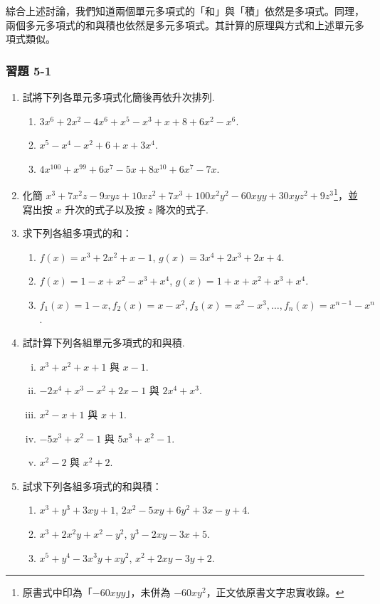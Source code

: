 綜合上述討論，我們知道兩個單元多項式的「和」與「積」依然是多項式。同理，兩個多元多項式的和與積也依然是多元多項式。其計算的原理與方式和上述單元多項式類似。

\subsubsection*{習題 5-1}\label{sec:ex5-1}

\begin{enumerate}[1.]
  \item 試將下列各單元多項式化簡後再依升次排列.
  \begin{enumerate}[(1)]
    \item $3x^6 + 2x^2 - 4x^6 + x^5 - x^3 + x + 8 + 6x^2 - x^6$.
    \item $x^5 - x^4 - x^2 + 6 + x + 3x^4$.
    \item $4x^{100} + x^{99} + 6x^7 - 5x + 8x^{10} + 6x^7 - 7x$.
  \end{enumerate}

  \item 化簡 $x^3 + 7x^2 z - 9xyz + 10xz^2 + 7x^3 + 100x^2 y^2 - 60xyy + 30xyz^2 + 9z^3$\footnote{原書式中印為「$-60xyy$」，未併為 $-60xy^2$，正文依原書文字忠實收錄。}，並寫出按 $x$ 升次的式子以及按 $z$ 降次的式子.

  \item 求下列各組多項式的和：
  \begin{enumerate}[(1)]
    \item $f(x)=x^3+2x^2+x-1$, $g(x)=3x^4+2x^3+2x+4$.
    \item $f(x)=1-x+x^2-x^3+x^4$, $g(x)=1+x+x^2+x^3+x^4$.
    \item $f_1(x)=1-x, f_2(x)=x-x^2, f_3(x)=x^2-x^3, \dots, f_n(x)=x^{n-1}-x^n$.
  \end{enumerate}

  \item 試計算下列各組單元多項式的和與積.
  \begin{enumerate}[(i)]
    \item $x^3+x^2+x+1$ 與 $x-1$.
    \item $-2x^4+x^3-x^2+2x-1$ 與 $2x^4+x^3$.
    \item $x^2-x+1$ 與 $x+1$.
    \item $-5x^3+x^2-1$ 與 $5x^3+x^2-1$.
    \item $x^2-2$ 與 $x^2+2$.
  \end{enumerate}

  \item 試求下列各組多項式的和與積：
  \begin{enumerate}[(1)]
    \item $x^3+y^3+3xy+1$, $2x^2-5xy+6y^2+3x-y+4$.
    \item $x^3+2x^2 y+x^2-y^2$, $y^3-2xy-3x+5$.
    \item $x^5+y^4-3x^3 y+xy^2$, $x^2+2xy-3y+2$.
  \end{enumerate}


\end{enumerate}
